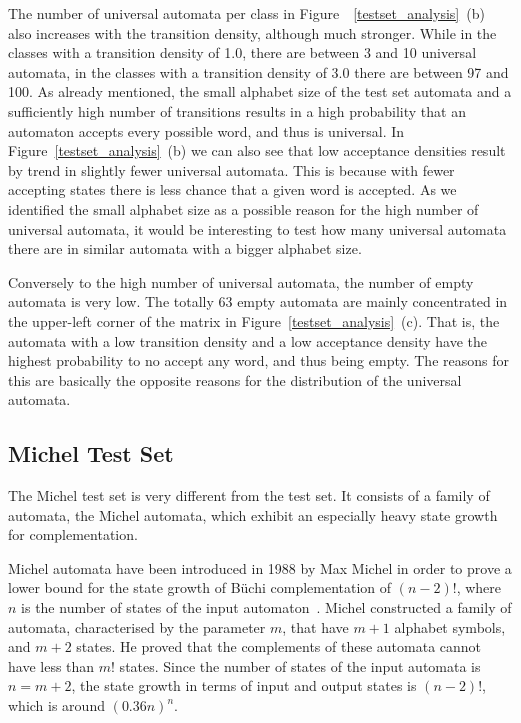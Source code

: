 The number of universal automata per class in Figure~~\ref{testset_analysis}~(b) also increases with the transition density, although much stronger. While in the classes with a transition density of 1.0, there are between 3 and 10 universal automata, in the classes with a transition density of 3.0 there are between 97 and 100. As already mentioned, the small alphabet size of the \goal{} test set automata and a sufficiently high number of transitions results in a high probability that an automaton accepts every possible word, and thus is universal. In Figure~\ref{testset_analysis}~(b) we can also see that low acceptance densities result by trend in slightly fewer universal automata. This is because with fewer accepting states there is less chance that a given word is accepted. As we identified the small alphabet size as a possible reason for the high number of universal automata, it would be interesting to test how many universal automata there are in similar automata with a bigger alphabet size.

Conversely to the high number of universal automata, the number of empty automata is very low. The totally 63 empty automata are mainly concentrated in the upper-left corner of the matrix in Figure~\ref{testset_analysis}~(c). That is, the automata with a low transition density and a low acceptance density have the highest probability to no accept any word, and thus being empty. The reasons for this are basically the opposite reasons for the distribution of the universal automata.


\subsection{Michel Test Set}
The Michel test set is very different from the \goal{} test set. It consists of a family of automata, the Michel automata, which exhibit an especially heavy state growth for complementation.

Michel automata have been introduced in 1988 by Max Michel in order to prove a lower bound for the state growth of Büchi complementation of $(n-2)!$, where $n$ is the number of states of the input automaton~\cite{michel1988}\cite{1996_thomas}. Michel constructed a family of automata, characterised by the parameter $m$, that have $m+1$ alphabet symbols, and $m+2$ states. He proved that the complements of these automata cannot have less than $m!$ states. Since the number of states of the input automata is $n = m + 2$, the state growth in terms of input and output states is $(n-2)!$, which is around $(0.36n)^n$.


